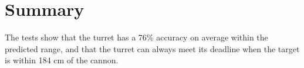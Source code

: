 \section{Summary}
The tests show that the turret has a 76\% accuracy on average within the predicted range, and that the turret can always meet its deadline when the target is within 184 cm of the cannon. 